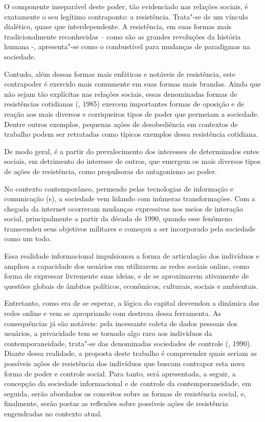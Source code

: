 O componente inseparável deste poder, tão evidenciado nas relações
sociais, é exatamente o seu legítimo contraponto: a resistência.
Trata"-se de um vínculo dialético, quase que interdependente. A
resistência, em suas formas mais tradicionalmente reconhecidas -- como
são as grandes revoluções da história humana -, apresenta"-se como o
combustível para mudanças de paradigmas na sociedade.

Contudo, além dessas formas mais enfáticas e notáveis de resistência,
este contrapoder é exercido mais comumente em suas formas mais brandas.
Ainda que não sejam tão explícitas nas relações sociais, essas
denominadas formas de resistências cotidianas (, 1985) exercem
importantes formas de oposição e de reação aos mais diversos e
corriqueiros tipos de poder que permeiam a sociedade. Dentre outros
exemplos, pequenas ações de desobediência em contextos de trabalho podem
ser retratadas como típicos exemplos dessa resistência cotidiana.

De modo geral, é a partir do prevalecimento dos interesses de
determinados entes sociais, em detrimento do interesse de outros, que
emergem os mais diversos tipos de ações de resistência, como propulsoras
do antagonismo ao poder.

No contexto contemporâneo, permeado pelas tecnologias de informação e
comunicação (s), a sociedade vem lidando com inúmeras transformações.
Com a chegada da internet ocorreram mudanças expressivas nos meios de
interação social, principalmente a partir da década de 1990, quando esse
fenômeno transcendeu seus objetivos militares e começou a ser
incorporado pela sociedade como um todo.

Essa realidade informacional impulsionou a forma de articulação dos
indivíduos e ampliou a capacidade dos usuários em utilizarem as redes
sociais online, como forma de expressar livremente suas ideias, e de se
aproximarem ativamente de questões globais de âmbitos políticos,
econômicos, culturais, sociais e ambientais.

Entretanto, como era de se esperar, a lógica do capital desvendou a
dinâmica das redes online e vem se apropriando com destreza dessa
ferramenta. As consequências já são notáveis: pela incessante coleta de
dados pessoais dos usuários, a privacidade tem se tornado algo raro aos
indivíduos da contemporaneidade, trata"-se das denominadas sociedades de
controle (, 1990). Diante dessa realidade, a proposta deste
trabalho é compreender quais seriam as possíveis ações de resistência
dos indivíduos que buscam contrapor esta nova forma de poder e controle
social. Para tanto, será apresentada, a seguir, a concepção da sociedade
informacional e de controle da contemporaneidade, em seguida, serão
abordados os conceitos sobre as formas de resistência social, e,
finalmente, serão postas as reflexões sobre possíveis ações de
resistência engendradas no contexto atual.

